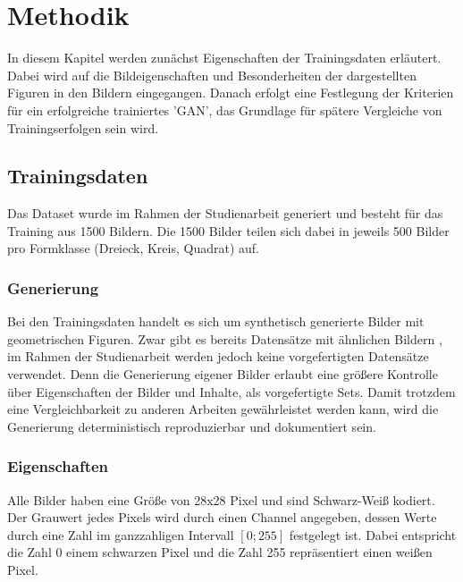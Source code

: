 
\chapter{Methodik}
In diesem Kapitel werden zunächst Eigenschaften der Trainingsdaten erläutert.
Dabei wird auf die Bildeigenschaften und Besonderheiten der dargestellten Figuren in den Bildern eingegangen.
Danach erfolgt eine Festlegung der Kriterien für ein erfolgreiche trainiertes 'GAN', das Grundlage für spätere Vergleiche von Trainingserfolgen sein wird.

\section{Trainingsdaten}
Das Dataset wurde im Rahmen der Studienarbeit generiert und besteht für das Training aus 1500 Bildern.
Die 1500 Bilder teilen sich dabei in jeweils 500 Bilder pro Formklasse (Dreieck, Kreis, Quadrat) auf.

\subsection{Generierung}
Bei den Trainingsdaten handelt es sich um synthetisch generierte Bilder mit geometrischen Figuren. 
Zwar gibt es bereits Datensätze mit ähnlichen Bildern \cite{dataset:2d-geometric-shapes-dataset, dataset:four-shapes}, im Rahmen der Studienarbeit werden jedoch keine vorgefertigten Datensätze verwendet. 
Denn die Generierung eigener Bilder erlaubt eine größere Kontrolle über Eigenschaften der Bilder und Inhalte, als vorgefertigte Sets.
Damit trotzdem eine Vergleichbarkeit zu anderen Arbeiten gewährleistet werden kann, wird die Generierung deterministisch reproduzierbar und dokumentiert sein.

\subsection{Eigenschaften}
Alle Bilder haben eine Größe von 28x28 Pixel und sind Schwarz-Weiß kodiert.
Der Grauwert jedes Pixels wird durch einen Channel angegeben, dessen Werte durch eine Zahl im ganzzahligen Intervall $[0; 255]$ festgelegt ist.
Dabei entspricht die Zahl 0 einem schwarzen Pixel und die Zahl 255 repräsentiert einen weißen Pixel.
\newline

